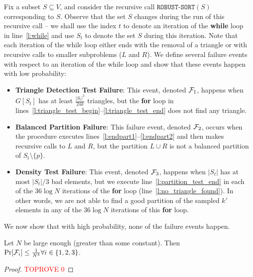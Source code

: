 \documentclass[11pt]{llncs}
\newcommand{\RS}{{\texttt{ROBUST-SORT}}}
\begin{document}
Fix a subset $S \subseteq V$, and consider the recursive call $\RS(S)$ corresponding to $S$. Observe that the set $S$ changes during the run of this recursive call -- we shall use the index $t$ to denote an iteration of the {\bf while} loop in line~\ref{l:while} and use $S_t$ to denote the set $S$ during this iteration. Note that each iteration of the while loop either ends with the removal of a triangle or with recursive calls to smaller subproblems ($L$ and $R$).
We define several failure events with respect to an iteration of the while loop and show that these events happen with low probability: 
\begin{itemize}
\item {\bf Triangle Detection Test Failure}: This event, denoted ${\cal F}_1$, happens when $G[S_t]$ has at least $\frac{|S_t|^3}{24 k}$ triangles, but the {\bf for} loop in lines~\ref{l:triangle_test_begin}--\ref{l:triangle_test_end} does not find any triangle. 

\item {\bf Balanced Partition Failure}: This failure event, denoted ${\cal F}_2$, occurs when the procedure executes lines~\ref{l:endpart1}--\ref{l:endpart2} and then makes recursive calls to $L$ and $R$, but the partition $L \cup R$ is not a balanced partition of $S_t \setminus \{p\}$.  

\item {\bf Density Test Failure}: This event, denoted ${\cal F}_3$, happens when $|S_t|$ has at most $|S_t|/3$ bad elements, but we execute line~\ref{l:partition_test_end} in each of the $36 \log N$ iterations of the {\bf for} loop (line~\ref{l:no_triangle_found}). In other words, we are not able to find a good partition of the sampled $k'$ elements in any of the $36 \log N$ iterations of this {\bf for} loop. 
\end{itemize}
We now show that with high probability, none of the failure events happen. 
\begin{lemma}
    \label{lem:nofailure}
    Let $N$ be large enough (greater than some constant). Then
    $\Pr[{\cal F}_i] \leq \frac{1}{N^3} \forall i \in \{1, 2, 3\}$.
\end{lemma}
\begin{proof}\textcolor{red}{TOPROVE 0}\end{proof}
\end{document}

